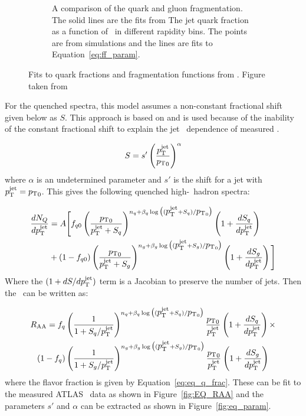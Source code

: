 \begin{figure}
\begin{subfigure}{.45\textwidth}
\caption{A comparison of the  quark and gluon fragmentation. The solid lines are the fits from The jet quark fraction as a function of \ptjet\ in different rapidity bins. The points are from  simulations and the lines are fits to Equation~\ref{eq:ff_param}.}
\label{fig:gluon_fragmentation}
\end{subfigure}
\caption{Fits to quark fractions and fragmentation functions from .  Figure taken from \cite{Spousta:2015fca}}
\label{fig:EQ_pp_models}
\end{figure}


For the quenched spectra, this model assumes a non-constant fractional shift given below as $S$. This approach is based on \cite{baier2001quenching} and is used because of the inability of the constant fractional shift to explain the jet \pt\ dependence of measured \RAA. 

\begin{align}
S = s' \left( \frac{\mbox{$p_{\mathrm{T}}^{\mathrm{jet}}$}}{\mbox{$p_{\mathrm{T}}$}_0} \right) ^\alpha
\end{align}
where $\alpha$ is an undetermined parameter and $s'$ is the shift for a jet with $\mbox{$p_{\mathrm{T}}^{\mathrm{jet}}$} = \mbox{$p_{\mathrm{T}}$}_0$. This gives the following quenched high-\pt\ hadron spectra:

\begin{align}
 \frac{dN_Q}{d\mbox{$p_{\mathrm{T}}^{\mathrm{jet}}$}} &= A \Bigg[ f_{q0} \left( \frac{\mbox{$p_{\mathrm{T}}$}_0}{\mbox{$p_{\mathrm{T}}^{\mathrm{jet}}$}+S_q} \right)^{n_q+ \beta_q \log\big((\mbox{$p_{\mathrm{T}}^{\mathrm{jet}}$}+S_q) / \mbox{$p_{\mathrm{T}}$}_0\big)} \left(1 + \frac{dS_q}{d\mbox{$p_{\mathrm{T}}^{\mathrm{jet}}$}} \right) \\
& + (1-f_{q0}) \left( \frac{\mbox{$p_{\mathrm{T}}$}_0}{\mbox{$p_{\mathrm{T}}^{\mathrm{jet}}$}+S_g} \right)^{n_g + \beta_g \log\big((\mbox{$p_{\mathrm{T}}^{\mathrm{jet}}$}+S_g) / \mbox{$p_{\mathrm{T}}$}_0\big)}  \left(1 + \frac{dS_g}{d\mbox{$p_{\mathrm{T}}^{\mathrm{jet}}$}} \right) \Bigg] \nonumber
\end{align}
Where the $(1+dS/d\mbox{$p_{\mathrm{T}}^{\mathrm{jet}}$})$ term is a Jacobian to preserve the number of jets. 
Then the \RAA\ can be written as:

\begin{align}
\mbox{$R_{\rm AA}$} = f_q & \left(\frac{1}{1 + S_q / \mbox{$p_{\mathrm{T}}^{\mathrm{jet}}$}}\right) ^{n_q + \beta_q \log\big((\mbox{$p_{\mathrm{T}}^{\mathrm{jet}}$}+S_q)/\mbox{$p_{\mathrm{T}}$}_0\big)}  \frac{\mbox{$p_{\mathrm{T}}$}_0}{\mbox{$p_{\mathrm{T}}^{\mathrm{jet}}$}}^{} \left( 1+ \frac{dS_q}{d\mbox{$p_{\mathrm{T}}^{\mathrm{jet}}$}} \right) \times  \\
 (1-f_q) & \left(\frac{1}{1 + S_g / \mbox{$p_{\mathrm{T}}^{\mathrm{jet}}$}}\right) ^{n_g + \beta_g \log\big((\mbox{$p_{\mathrm{T}}^{\mathrm{jet}}$}+S_g)/\mbox{$p_{\mathrm{T}}$}_0\big)}  \frac{\mbox{$p_{\mathrm{T}}$}_0}{\mbox{$p_{\mathrm{T}}^{\mathrm{jet}}$}}^{} \left( 1+ \frac{dS_g}{d\mbox{$p_{\mathrm{T}}^{\mathrm{jet}}$}} \right)  \nonumber \\
\end{align}
where the flavor fraction is given by Equation~\ref{eq:eq_q_frac}. These can be fit to the measured ATLAS \RAA\ data as shown in Figure~\ref{fig:EQ_RAA} and the parameters $s'$ and $\alpha$ can be extracted as shown in Figure~\ref{fig:eq_param}. 


